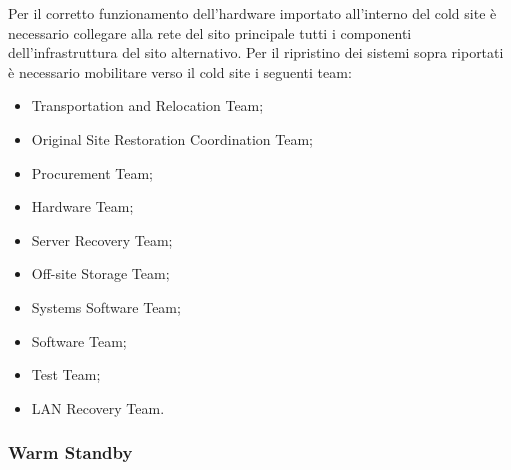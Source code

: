 \documentclass[12pt, a4paper, titlepage]{report}
\begin{document}
	Per il corretto funzionamento dell'hardware importato all'interno del cold site è necessario collegare alla rete del sito principale tutti i componenti dell'infrastruttura del sito alternativo.
	Per il ripristino dei sistemi sopra riportati è necessario mobilitare verso il cold site i seguenti team:
	\begin{itemize}
		\item Transportation and Relocation Team;
		\item Original Site Restoration Coordination Team;
		\item Procurement Team;
		\item Hardware Team;
		\item Server Recovery Team;
		\item Off-site Storage Team;
		\item Systems Software Team;
		\item Software Team;
		\item Test Team;
		\item LAN Recovery Team.
	\end{itemize}
	
	\newpage
	
	\subsubsection{Warm Standby} \label{warm}
	
\end{document}
